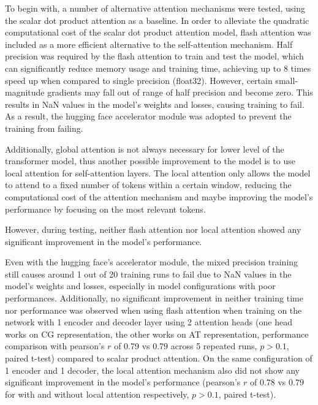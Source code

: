 To begin with, a number of alternative attention mechanisms were tested, using the scalar dot product attention as a baseline. In order to alleviate the quadratic computational cost of the scalar dot product attention model, flash attention was included as a more efficient alternative to the self-attention mechanism. Half precision was required by the flash attention to train and test the model, which can significantly reduce memory usage and training time, achieving up to 8 times speed up when compared to single precision (float32)\cite{micikeviciusMixedPrecisionTraining2018}. However, certain small-magnitude gradients may fall out of range of half precision and become zero. This results in NaN values in the model's weights and losses, causing training to fail. As a result, the hugging face accelerator module was adopted to prevent the training from failing\cite{wolfHuggingFaceTransformersStateoftheart2020}. 

Additionally, global attention is not always necessary for lower level of the transformer model\cite{raeTransformersNeedDeep2020}, thus another 
possible improvement to the model is to use local attention for self-attention layers. The local attention only allows the model to attend to a fixed number of tokens within a certain window, reducing the computational cost of the attention mechanism and maybe improving the model's performance by focusing on the most relevant tokens.

However, during testing, neither flash attention nor local attention showed any significant improvement in the model's performance.

Even with the hugging face's accelerator module, the mixed precision training still causes around 1 out of 20 training runs to fail due to NaN values in the model's weights and losses, especially in model configurations with poor performances. Additionally, no significant improvement in neither training time nor performance was observed when using flash attention when training on the network with 1 encoder and decoder layer using 2 attention heads (one head works on CG representation, the other works on AT representation, performance comparison with pearson's $r$ of 0.79 vs 0.79 across 5 repeated runs, $p>0.1$, paired t-test) compared to scalar product attention. On the same configuration of 1 encoder and 1 decoder, the local attention mechanism also did not show any significant improvement in the model's performance (pearson's $r$ of 0.78 vs 0.79 for with and without local attention respectively, $p>0.1$, paired t-test).

